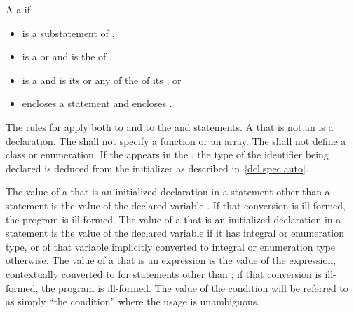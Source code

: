 \pnum
A   
a   if
\begin{itemize}
\item
   is a substatement of ,
\item
   is a  or
   and
   is the  of ,
\item
   is a  and 
  is its  or
  any of the  of
  its , or
\item
   encloses a statement  and  encloses .
\end{itemize}

\pnum
{}%
The rules for  apply both to
 and to the  and 
statements.
A  that is not an  is a
declaration.
The  shall not
specify a function or an array. The  shall not
define a class or enumeration. If the   appears in
the ,
the type of the identifier being declared is deduced from the initializer as described in~\ref{dcl.spec.auto}.

\pnum
The value of a  that is an initialized declaration
in a statement other than a  statement is the value of the
declared variable
.
If that
conversion is ill-formed, the program is ill-formed. The value of a
 that is an initialized declaration in a
 statement is the value of the declared variable if it has
integral or enumeration type, or of that variable implicitly converted
to integral or enumeration type otherwise. The value of a
 that is an expression is the value of the
expression, contextually converted to 
for statements other
than ;
if that conversion is ill-formed, the program is
ill-formed. The value of the condition will be referred to as simply
``the condition'' where the usage is unambiguous.

